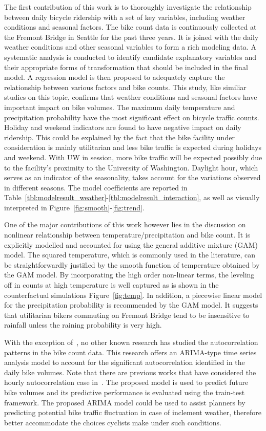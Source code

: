 \documentclass [11pt, proquest] {uwthesis}[2015/03/03]
\begin{document}
The first contribution of this work is to thoroughly investigate the relationship between daily bicycle ridership with a set of key variables, including weather conditions and seasonal factors. The bike count data is continuously collected at the Fremont Bridge in Seattle for the past three years. It is joined with the daily weather conditions and other seasonal variables to form a rich modeling data. A systematic analysis is conducted to identify candidate explanatory variables and their appropriate forms of transformation that should be included in the final model. A regression model is then proposed to adequately capture the relationship between various factors and bike counts. This study, like similiar studies on this topic, confirms that weather conditions and seasonal factors have important impact on bike volumes. The maximum daily temperature and precipitation probability have the most significant effect on bicycle traffic counts. Holiday and weekend indicators are found to have negative impact on daily ridership. This could be explained by the fact that the bike facility under consideration is mainly utilitarian and less bike traffic is expected during holidays and weekend. With UW in session, more bike traffic will be expected possibly due to the facility's proximity to the University of Washington. Daylight hour, which serves as an indicator of the seasonality, takes account for the variations observed in different seasons. The model coefficients are reported in Table~\ref{tbl:modelresult_weather}-\ref{tbl:modelresult_interaction}, as well as visually interpreted in Figure~\ref{fig:smooth}-\ref{fig:trend}.

One of the major contributions of this work however lies in the discussion on nonlinear relationship between temperature/precipitation and bike count. It is explicitly modelled and accounted for using the general additive mixture (GAM) model. The squared temperature, which is commonly used in the literature, can be straightforwardly justified by the smooth function of temperature obtained by the GAM model. By incorporating the high order non-linear terms, the leveling off in counts at high temperature is well captured as is shown in the counterfactual simulations Figure~\ref{fig:temp}. In addition, a piecewise linear model for the precipitation probability is recommended by the GAM model. It suggests that utilitarian bikers commuting on Fremont Bridge tend to be insensitive to rainfall unless the raining probability is very high.

With the exception of~\cite{Gallop:2012aa,Nosal:2014aa}, no other known research has studied the autocorrelation patterns in the bike count data. This research offers an ARIMA-type time series analysis model to account for the significant autocorrelation identified in the daily bike volumes. Note that there are previous works that have considered the hourly autocorrelation case in~\cite{Gallop:2012aa,Nosal:2014aa}. The proposed model is used to predict future bike volumes and its predictive performance is evaluated using the train-test framework. The proposed ARIMA model could be used to assist planners by predicting potential bike traffic fluctuation in case of inclement weather, therefore better accommodate the choices cyclists make under such conditions. 
\end{document}
